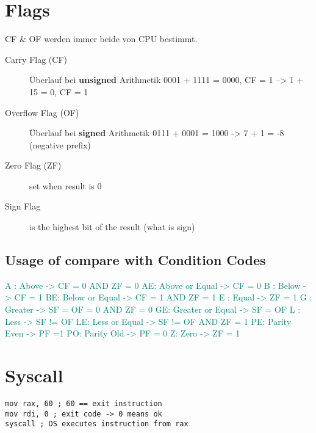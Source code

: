 \begin{multicols*}{4}
\section{Flags}
CF \& OF werden immer beide von CPU bestimmt.

\begin{description}
    \item[Carry Flag (CF)] Überlauf bei \textbf{unsigned} Arithmetik
    0001 + 1111 = 0000, CF = 1 --> 1 + 15 = 0, CF = 1
    \item[Overflow Flag (OF)] Überlauf bei \textbf{signed} Arithmetik
    0111 + 0001 = 1000 -> 7 + 1 = -8 (negative prefix)
    \item[Zero Flag (ZF)] set when result is 0
    \item[Sign Flag] is the highest bit of the result (what is sign)
\end{description}

\subsection{Usage of compare with Condition Codes}
\textcolor{teal}{A : Above } \textcolor{teal}{ -> CF = 0 AND ZF = 0}\newline
\textcolor{teal}{AE: Above or Equal } \textcolor{teal}{ -> CF = 0}\newline
\textcolor{teal}{B : Below } \textcolor{teal}{ -> CF = 1}\newline
\textcolor{teal}{BE: Below or Equal } \textcolor{teal}{ -> CF = 1 AND ZF = 1}\newline
\textcolor{teal}{E : Equal } \textcolor{teal}{ -> ZF = 1}\newline
\textcolor{teal}{G : Greater } \textcolor{teal}{ -> SF = OF = 0 AND ZF = 0}\newline
\textcolor{teal}{GE: Greater or Equal } \textcolor{teal}{ -> SF = OF}\newline
\textcolor{teal}{L : Less } \textcolor{teal}{ -> SF != OF}\newline
\textcolor{teal}{LE: Less or Equal } \textcolor{teal}{ -> SF != OF AND ZF = 1}\newline
\textcolor{teal}{PE: Parity Even}  \textcolor{teal}{ -> PF =1}\newline
\textcolor{teal}{PO: Parity Old } \textcolor{teal}{ -> PF = 0}\newline
\textcolor{teal}{Z:  Zero} \textcolor{teal}{ -> ZF = 1}

\section{Syscall}
\begin{lstlisting}[language={[x86masm]Assembler}]
mov rax, 60 ; 60 == exit instruction
mov rdi, 0 ; exit code -> 0 means ok
syscall ; OS executes instruction from rax
\end{lstlisting}


\end{multicols*}
